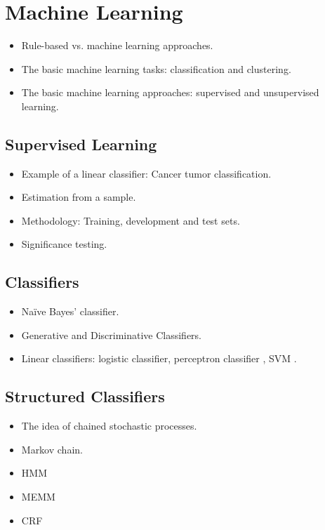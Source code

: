 \chapter{Machine Learning}

\begin{itemize}
\item Rule-based vs. machine learning approaches.
\item The basic machine learning tasks: classification and clustering.
\item The basic machine learning approaches: supervised and
  unsupervised learning.
\end{itemize}

\section{Supervised Learning}
\begin{itemize}
\item Example of a linear classifier: Cancer tumor classification.
\item Estimation from a sample.
\item Methodology: Training, development and test sets. 
\item Significance testing.
\end{itemize}

\section{Classifiers}
\begin{itemize}
\item Naïve Bayes' classifier.
\item Generative and Discriminative Classifiers.
\item Linear classifiers: logistic classifier, perceptron classifier \citep{Freund1999},
  SVM \citep{Cortes1995}.
\end{itemize}

\section{Structured Classifiers}
\begin{itemize}
\item The idea of chained stochastic processes.
\item Markov chain.
\item HMM
\item MEMM
\item CRF
\end{itemize}
